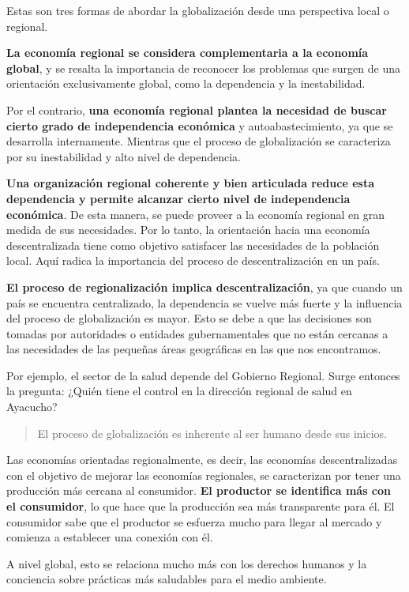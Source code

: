 \documentclass[
  jou,
  floatsintext,
  longtable,
  a4paper,
  nolmodern,
  notxfonts,
  notimes,
  12pt,
  colorlinks=true,linkcolor=blue,citecolor=blue,urlcolor=blue]{apa7}
\begin{document}
Estas son tres formas de abordar la globalización desde una perspectiva
local o regional.

\textbf{La economía regional se considera complementaria a la economía
global}, y se resalta la importancia de reconocer los problemas que
surgen de una orientación exclusivamente global, como la dependencia y
la inestabilidad.

Por el contrario, \textbf{una economía regional plantea la necesidad de
buscar cierto grado de independencia económica} y autoabastecimiento, ya
que se desarrolla internamente. Mientras que el proceso de globalización
se caracteriza por su inestabilidad y alto nivel de dependencia.

\textbf{Una organización regional coherente y bien articulada reduce
esta dependencia y permite alcanzar cierto nivel de independencia
económica}. De esta manera, se puede proveer a la economía regional en
gran medida de sus necesidades. Por lo tanto, la orientación hacia una
economía descentralizada tiene como objetivo satisfacer las necesidades
de la población local. Aquí radica la importancia del proceso de
descentralización en un país.

\textbf{El proceso de regionalización implica descentralización}, ya que
cuando un país se encuentra centralizado, la dependencia se vuelve más
fuerte y la influencia del proceso de globalización es mayor. Esto se
debe a que las decisiones son tomadas por autoridades o entidades
gubernamentales que no están cercanas a las necesidades de las pequeñas
áreas geográficas en las que nos encontramos.

Por ejemplo, el sector de la salud depende del Gobierno Regional. Surge
entonces la pregunta: ¿Quién tiene el control en la dirección regional
de salud en Ayacucho?

\begin{quote}
El proceso de globalización es inherente al ser humano desde sus
inicios.
\end{quote}

Las economías orientadas regionalmente, es decir, las economías
descentralizadas con el objetivo de mejorar las economías regionales, se
caracterizan por tener una producción más cercana al consumidor.
\textbf{El productor se identifica más con el consumidor}, lo que hace
que la producción sea más transparente para él. El consumidor sabe que
el productor se esfuerza mucho para llegar al mercado y comienza a
establecer una conexión con él.

A nivel global, esto se relaciona mucho más con los derechos humanos y
la conciencia sobre prácticas más saludables para el medio ambiente.
\end{document}
